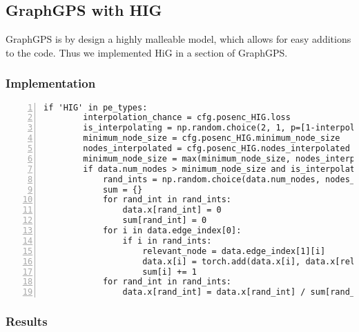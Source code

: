 \subsection{GraphGPS with HIG}
GraphGPS is by design a highly malleable model, which allows for easy additions to the code. Thus we implemented HiG in a section of GraphGPS.


\subsubsection{Implementation}

\begin{lstlisting}[style=cpp,caption={HiG-Code in GraphGPS},label={lst:Void},numbers=left]
    if 'HIG' in pe_types:
        interpolation_chance = cfg.posenc_HIG.loss
        is_interpolating = np.random.choice(2, 1, p=[1-interpolation_chance, interpolation_chance])[0]
        minimum_node_size = cfg.posenc_HIG.minimum_node_size
        nodes_interpolated = cfg.posenc_HIG.nodes_interpolated
        minimum_node_size = max(minimum_node_size, nodes_interpolated)
        if data.num_nodes > minimum_node_size and is_interpolating == 1:
            rand_ints = np.random.choice(data.num_nodes, nodes_interpolated, replace=False)
            sum = {}
            for rand_int in rand_ints:
                data.x[rand_int] = 0
                sum[rand_int] = 0
            for i in data.edge_index[0]:
                if i in rand_ints:
                    relevant_node = data.edge_index[1][i]
                    data.x[i] = torch.add(data.x[i], data.x[relevant_node])
                    sum[i] += 1
            for rand_int in rand_ints:
                data.x[rand_int] = data.x[rand_int] / sum[rand_int]
\end{lstlisting}

\subsubsection{Results}

